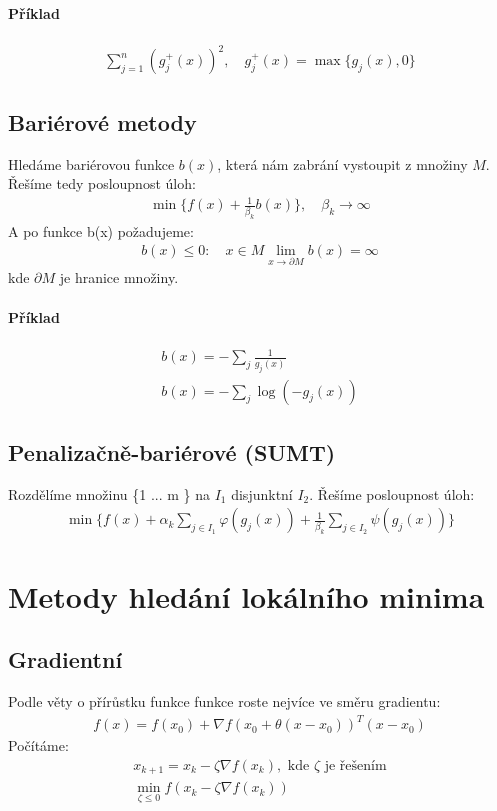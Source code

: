 \documentclass[a4paper,12pt,titlepage]{article}
\begin{document}
\paragraph{Příklad}
\begin{align}
	\sum_{j=1}^n (g_j^+(x))^2, \quad g_j^+(x) = \max \{ g_j(x), 0 \}
\end{align}
\subsection{Bariérové metody}
\setcounter{equation}{0}
Hledáme bariérovou funkce $b(x)$, která nám zabrání vystoupit z množiny $M$.
Řešíme tedy posloupnost úloh:
\begin{align}
	\min \{ f(x) + \frac{1}{\beta_k} b(x) \}, \quad \beta_k \to \infty
\end{align}
A po funkce b(x) požadujeme:
\begin{align}
	b(x) \le 0: \quad x \in M
	\lim_{x \to \partial M} b(x) = \infty
\end{align}
kde $\partial M$ je hranice množiny.
\paragraph{Příklad}
\begin{align}
	b(x) = - \sum_j \frac{1}{g_j(x)} \\
	b(x) = - \sum_j \log (-g_j(x))
\end{align}
\subsection{Penalizačně-bariérové (SUMT)}
\setcounter{equation}{0}
Rozdělíme množinu \{1 ... m \} na $I_1$ disjunktní $I_2$. Řešíme posloupnost
úloh:
\begin{align}
	\min \{ f(x) + \alpha_k \sum_{j\in I_1}  \varphi(g_j(x)) + \frac{1}{\beta_k}
	\sum_{j\in I_2} \psi (g_j(x)) \}
\end{align}

\section{Metody hledání lokálního minima}
\setcounter{equation}{0}
\subsection{Gradientní}
\setcounter{equation}{0}
Podle věty o přírůstku funkce funkce roste nejvíce ve směru gradientu:
\begin{align}
	f(x) = f(x_0) + \nabla f(x_0 + \theta(x-x_0))^T(x-x_0)
\end{align}
Počítáme:
\begin{align}
	x_{k+1} = x_k - \zeta \nabla f(x_k), \text{ kde }\zeta\text{ je	řešením} \\
	\min_{\zeta \le 0} f(x_k - \zeta \nabla f(x_k))
\end{align}
\end{document}
